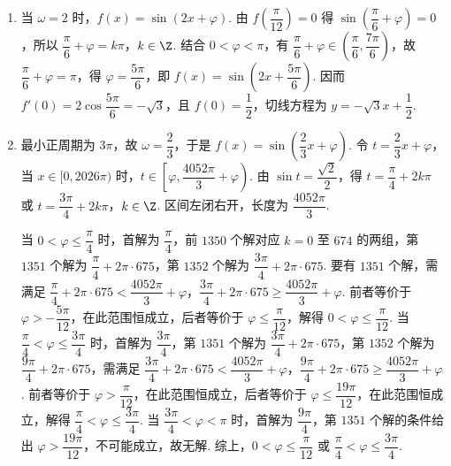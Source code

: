 \begin{solution}
\begin{enumerate}
\item 当 \(\omega=2\) 时，\(f(x)=\sin(2x+\varphi)\). 由 \(f\left(\dfrac{\pi}{12}\right)=0\) 得 \(\sin\left(\dfrac{\pi}{6}+\varphi\right)=0\)，所以 \(\dfrac{\pi}{6}+\varphi=k\pi\)，\(k\in\Z\). 结合 \(0<\varphi<\pi\)，有 \(\dfrac{\pi}{6}+\varphi\in\left(\dfrac{\pi}{6},\dfrac{7\pi}{6}\right)\)，故 \(\dfrac{\pi}{6}+\varphi=\pi\)，得 \(\varphi=\dfrac{5\pi}{6}\)，即 \(f(x)=\sin\left(2x+\dfrac{5\pi}{6}\right)\). 因而 \(f'(0)=2\cos\dfrac{5\pi}{6}=-\sqrt3\)，且 \(f(0)=\dfrac12\)，切线方程为 \(y=-\sqrt3x+\dfrac12\).

\item 最小正周期为 \(3\pi\)，故 \(\omega=\dfrac23\)，于是 \(f(x)=\sin\left(\dfrac23x+\varphi\right)\). 令 \(t=\dfrac23x+\varphi\)，当 \(x\in[0,2026\pi)\) 时，\(t\in\left[\varphi,\dfrac{4052\pi}{3}+\varphi\right)\). 由 \(\sin t=\dfrac{\sqrt2}{2}\)，得 \(t=\dfrac{\pi}{4}+2k\pi\) 或 \(t=\dfrac{3\pi}{4}+2k\pi\)，\(k\in\Z\). 区间左闭右开，长度为 \(\dfrac{4052\pi}{3}\).

当 \(0<\varphi\le\dfrac{\pi}{4}\) 时，首解为 \(\dfrac{\pi}{4}\)，前 \(1350\) 个解对应 \(k=0\) 至 \(674\) 的两组，第 \(1351\) 个解为 \(\dfrac{\pi}{4}+2\pi\cdot675\)，第 \(1352\) 个解为 \(\dfrac{3\pi}{4}+2\pi\cdot675\). 要有 \(1351\) 个解，需满足 \(\dfrac{\pi}{4}+2\pi\cdot675<\dfrac{4052\pi}{3}+\varphi\)，\(\dfrac{3\pi}{4}+2\pi\cdot675\ge\dfrac{4052\pi}{3}+\varphi\). 前者等价于 \(\varphi>-\dfrac{5\pi}{12}\)，在此范围恒成立，后者等价于 \(\varphi\le\dfrac{\pi}{12}\)，解得 \(0<\varphi\le\dfrac{\pi}{12}\). 当 \(\dfrac{\pi}{4}<\varphi\le\dfrac{3\pi}{4}\) 时，首解为 \(\dfrac{3\pi}{4}\)，第 \(1351\) 个解为 \(\dfrac{3\pi}{4}+2\pi\cdot675\)，第 \(1352\) 个解为 \(\dfrac{9\pi}{4}+2\pi\cdot675\)，需满足 \(\dfrac{3\pi}{4}+2\pi\cdot675<\dfrac{4052\pi}{3}+\varphi\)，\(\dfrac{9\pi}{4}+2\pi\cdot675\ge\dfrac{4052\pi}{3}+\varphi\). 前者等价于 \(\varphi>\dfrac{\pi}{12}\)，在此范围恒成立，后者等价于 \(\varphi\le\dfrac{19\pi}{12}\)，在此范围恒成立，解得 \(\dfrac{\pi}{4}<\varphi\le\dfrac{3\pi}{4}\). 当 \(\dfrac{3\pi}{4}<\varphi<\pi\) 时，首解为 \(\dfrac{9\pi}{4}\)，第 \(1351\) 个解的条件给出 \(\varphi>\dfrac{19\pi}{12}\)，不可能成立，故无解. 综上，\(0<\varphi\le\dfrac{\pi}{12}\) 或 \(\dfrac{\pi}{4}<\varphi\le\dfrac{3\pi}{4}\).
\end{enumerate}
\end{solution}

